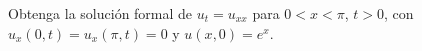 Obtenga la solución formal de $u_t=u_{xx}$ para $0<x<\pi$, $t>0$, con $u_x(0,t)=u_x(\pi,t)=0$ y $u(x,0)=e^x$.
